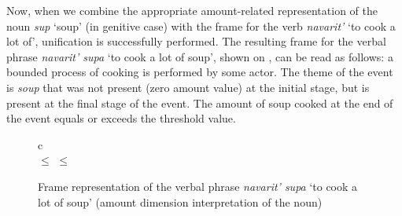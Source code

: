 Now, when we combine the appropriate amount-related representation of the noun \textit{sup} `soup' (in genitive case) with the frame for the verb \textit{navarit'} `to cook a lot of', unification is successfully performed. The resulting frame for the verbal phrase \textit{navarit' supa} `to cook a lot of soup', shown on , can be read as follows: a bounded process of cooking is performed by some actor. The theme of the event is \textit{soup} that was not present (zero amount value) at the initial stage, but is present at the final stage of the event. The amount of soup cooked at the end of the event equals or exceeds the threshold value. 

\begin{figure}
\begin{tabular}{c}
\\
 $\leq$  $\leq$ 
\end{tabular}
\caption{Frame representation of the verbal phrase \textit{navarit' supa} `to cook a lot of soup' (amount dimension interpretation of the noun) \label{frame:navarit:soup:amount}}
\end{figure}


